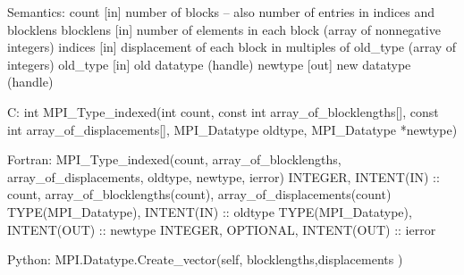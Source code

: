 Semantics:
count [in] number of blocks --
    also number of entries in indices and blocklens
blocklens [in] number of elements in each block (array of nonnegative integers)
indices [in] displacement of each block in multiples of old_type
    (array of integers)
old_type [in] old datatype (handle)
newtype [out] new datatype (handle)

C:
int MPI_Type_indexed(int count, const int array_of_blocklengths[],
    const int array_of_displacements[], MPI_Datatype oldtype, MPI_Datatype
    *newtype)

Fortran:
MPI_Type_indexed(count, array_of_blocklengths, array_of_displacements,
    oldtype, newtype, ierror)
INTEGER, INTENT(IN) :: count, array_of_blocklengths(count),
array_of_displacements(count)
TYPE(MPI_Datatype), INTENT(IN) :: oldtype
TYPE(MPI_Datatype), INTENT(OUT) :: newtype
INTEGER, OPTIONAL, INTENT(OUT) :: ierror

Python:
MPI.Datatype.Create_vector(self, blocklengths,displacements )
